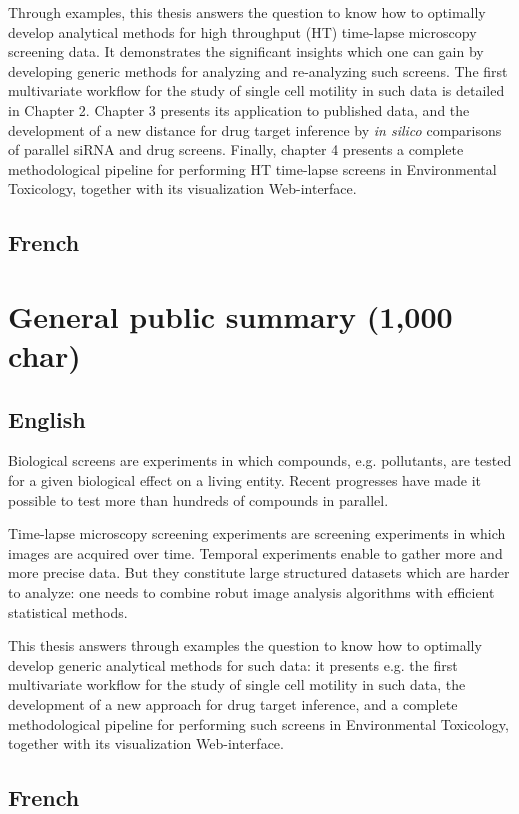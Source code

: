\documentclass[12pt]{article}
\begin{document}
Through examples, this thesis answers the question to know how to optimally develop analytical methods for high throughput (HT) time-lapse microscopy screening data. It demonstrates the significant insights which one can gain by developing generic methods for analyzing and re-analyzing such screens. The first multivariate workflow for the study of single cell motility in such data is detailed in Chapter 2. Chapter 3 presents its application to published data, and the development of a new distance for drug target inference by \textit{in silico} comparisons of parallel siRNA and drug screens.  Finally, chapter 4 presents a complete methodological pipeline for performing HT time-lapse screens in Environmental Toxicology, together with its visualization Web-interface.
\subsection{French}

\section{General public summary (1,000 char)}
\subsection{English}
Biological screens are experiments in which compounds, e.g. pollutants, are tested for a given biological effect on a living entity. Recent progresses have made it possible to test more than hundreds of compounds in parallel.

Time-lapse microscopy screening experiments are screening experiments in which images are acquired over time. Temporal experiments enable to gather more and more precise data. But they constitute large structured datasets which are harder to analyze: one needs to combine robut image analysis algorithms with efficient statistical methods.

This thesis answers through examples the question to know how to optimally develop generic analytical methods for such data: it presents e.g. the first multivariate workflow for the study of single cell motility in such data, the development of a new approach for drug target inference, and a complete methodological pipeline for performing such screens in Environmental Toxicology, together with its visualization Web-interface.

\subsection{French}
\end{document}
